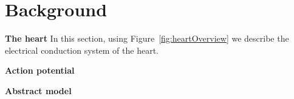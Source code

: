 \section{Background }
\begin{figure*}[htbp]
	\centering
	
	\caption{Electrical conduction systems of a heart}
	\label{fig:heartOverview}
\end{figure*}

\noindent \textbf{The heart}
In this section, using Figure~\ref{fig:heartOverview} we 
describe the electrical conduction system of the heart.
	
\noindent \textbf{Action potential}

\noindent \textbf{Abstract model}